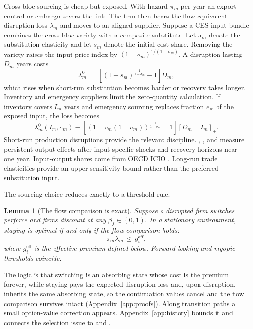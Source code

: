 \documentclass[11pt]{article}
\newtheorem{lemma}{Lemma}
\theoremstyle{definition}
\begin{document}
Cross-bloc sourcing is cheap but exposed. With hazard $\pi_m$ per year an export control or embargo severs the link. The firm then bears the flow-equivalent disruption loss $\lambda_m$ and moves to an aligned supplier. Suppose a CES input bundle combines the cross-bloc variety with a composite substitute. Let $\sigma_m$ denote the substitution elasticity and let $s_m$ denote the initial cost share. Removing the variety raises the input price index by $(1-s_m)^{1/(1-\sigma_m)}$. A disruption lasting $D_m$ years costs
\begin{equation}
\lambda_m^0 \,=\, \left[(1 - s_m)^{\frac{1}{1-\sigma_m}} - 1\right] D_m ,
\label{eq:lambda}
\end{equation}
which rises when short-run substitution becomes harder or recovery takes longer. Inventory and emergency suppliers limit the zero-quantity calculation. If inventory covers $I_m$ years and emergency sourcing replaces fraction $e_m$ of the exposed input, the loss becomes
\begin{equation}
\lambda_m^0(I_m,e_m)
=\left[\left(1-s_m(1-e_m)\right)^{\frac{1}{1-\sigma_m}}-1\right]
\left[D_m-I_m\right]_+.
\label{eq:lambda-buffer}
\end{equation}
Short-run production disruptions provide the relevant discipline. \citet{BarrotSauvagnat2016}, \citet{BoehmFlaaenPandalaiNayar2019}, and \citet{CarvalhoEtAl2021} measure persistent output effects after input-specific shocks and recovery horizons near one year. Input-output shares come from OECD ICIO \citep{OECDICIO}. Long-run trade elasticities provide an upper sensitivity bound rather than the preferred substitution input.

The sourcing choice reduces exactly to a threshold rule.

\begin{lemma}[The flow comparison is exact]\label{lem:flow}
Suppose a disrupted firm switches perforce and firms discount at any $\beta_f \in (0,1)$. In a stationary environment, staying is optimal if and only if the flow comparison holds:
\[
\pi_m \lambda_m \,\le\, g_i^{\mathrm{eff}},
\]
where $g_i^{\mathrm{eff}}$ is the effective premium defined below. Forward-looking and myopic thresholds coincide.
\end{lemma}

The logic is that switching is an absorbing state whose cost is the premium forever, while staying pays the expected disruption loss and, upon disruption, inherits the same absorbing state, so the continuation values cancel and the flow comparison survives intact (Appendix~\ref{app:proofs}). Along transition paths a small option-value correction appears. Appendix~\ref{app:history} bounds it and connects the selection issue to \citet{Krugman1991} and \citet{Matsuyama1991}.
\end{document}
